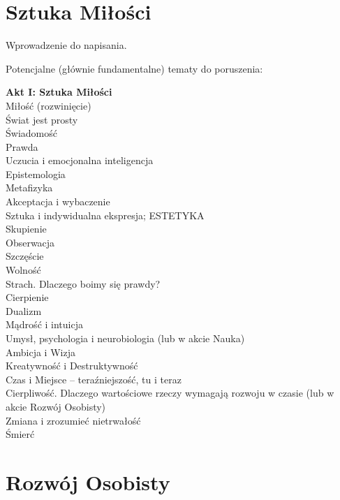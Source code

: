 \documentclass[]{coda-art}
\begin{document}

\clearpage\part{Sztuka Miłości}
\label{sztuka}

Wprowadzenie do napisania.

\vin Potencjalne (głównie fundamentalne) tematy do poruszenia:

\textbf{Akt I: Sztuka Miłości} \\
Miłość (rozwinięcie) \\
Świat jest prosty \\
Świadomość \\
Prawda \\
Uczucia i emocjonalna inteligencja \\
Epistemologia \\
Metafizyka \\
Akceptacja i wybaczenie \\
Sztuka i indywidualna ekspresja; ESTETYKA \\
Skupienie \\
Obserwacja \\
Szczęście \\
Wolność \\
Strach. Dlaczego boimy się prawdy? \\
Cierpienie \\
Dualizm \\
Mądrość i intuicja \\
Umysł, psychologia i neurobiologia (lub w akcie Nauka) \\
Ambicja i Wizja \\
Kreatywność i Destruktywność \\
Czas i Miejsce -- teraźniejszość, tu i teraz \\
Cierpliwość. Dlaczego wartościowe rzeczy wymagają rozwoju w czasie (lub w akcie Rozwój Osobisty) \\
Zmiana i zrozumieć nietrwałość \\
Śmierć

\clearpage



\clearpage\part{Rozwój Osobisty}
\label{akt:rozwoj}
\end{document}
